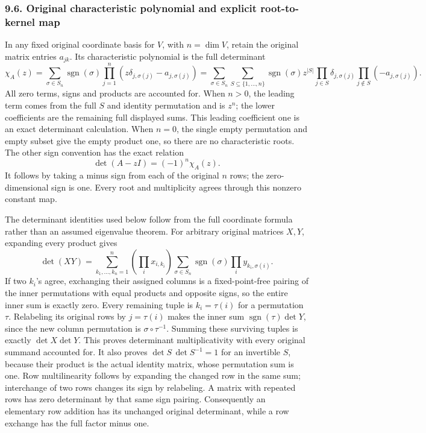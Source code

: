 \documentclass[
  11pt,
]{article}
\begin{document}
\subsubsection{9.6. Original characteristic polynomial and explicit
root-to-kernel
map}\label{original-characteristic-polynomial-and-explicit-root-to-kernel-map}

In any fixed original coordinate basis for \(V\), with \(n=\dim V\),
retain the original matrix entries \(a_{jk}\). Its characteristic
polynomial is the full determinant \[
 \chi_A(z)=\sum_{\sigma\in S_n}\operatorname{sgn}(\sigma)
                  \prod_{j=1}^n(z\delta_{j,\sigma(j)}-a_{j,\sigma(j)})
 =\sum_{\sigma\in S_n}\sum_{S\subseteq\{1,\ldots,n\}}
   \operatorname{sgn}(\sigma)z^{|S|}
    \prod_{j\in S}\delta_{j,\sigma(j)}
    \prod_{j\notin S}(-a_{j,\sigma(j)}).                         \tag{CR17}
\] All zero terms, signs and products are accounted for. When \(n>0\),
the leading term comes from the full \(S\) and identity permutation and
is \(z^n\); the lower coefficients are the remaining full displayed
sums. This leading coefficient one is an exact determinant calculation.
When \(n=0\), the single empty permutation and empty subset give the
empty product one, so there are no characteristic roots. The other sign
convention has the exact relation \[
                   \det(A-zI)=(-1)^n\chi_A(z).                \tag{CR18}
\] It follows by taking a minus sign from each of the original \(n\)
rows; the zero-dimensional sign is one. Every root and multiplicity
agrees through this nonzero constant map.

The determinant identities used below follow from the full coordinate
formula rather than an assumed eigenvalue theorem. For arbitrary
original matrices \(X,Y\), expanding every product gives \[
 \det(XY)=\sum_{k_1,\ldots,k_n=1}^n
       \left(\prod_i x_{i,k_i}\right)
       \sum_{\sigma\in S_n}\operatorname{sgn}(\sigma)
                         \prod_i y_{k_i,\sigma(i)} .           \tag{CR18a}
\] If two \(k_i\)'s agree, exchanging their assigned columns is a
fixed-point-free pairing of the inner permutations with equal products
and opposite signs, so the entire inner sum is exactly zero. Every
remaining tuple is \(k_i=\tau(i)\) for a permutation \(\tau\).
Relabeling its original rows by \(j=\tau(i)\) makes the inner sum
\(\operatorname{sgn}(\tau)\det Y\), since the new column permutation is
\(\sigma\circ\tau^{-1}\). Summing these surviving tuples is exactly
\(\det X\det Y\). This proves determinant multiplicativity with every
original summand accounted for. It also proves \(\det S\,\det S^{-1}=1\)
for an invertible \(S\), because their product is the actual identity
matrix, whose permutation sum is one. Row multilinearity follows by
expanding the changed row in the same sum; interchange of two rows
changes its sign by relabeling. A matrix with repeated rows has zero
determinant by that same sign pairing. Consequently an elementary row
addition has its unchanged original determinant, while a row exchange
has the full factor minus one.
\end{document}
